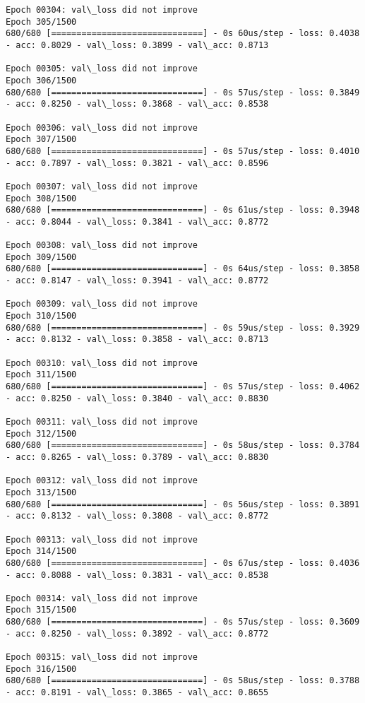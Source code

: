 \documentclass[11pt]{article}
\begin{document}
\begin{Verbatim}[commandchars=\\\{\}]
Epoch 00304: val\_loss did not improve
Epoch 305/1500
680/680 [==============================] - 0s 60us/step - loss: 0.4038 - acc: 0.8029 - val\_loss: 0.3899 - val\_acc: 0.8713

Epoch 00305: val\_loss did not improve
Epoch 306/1500
680/680 [==============================] - 0s 57us/step - loss: 0.3849 - acc: 0.8250 - val\_loss: 0.3868 - val\_acc: 0.8538

Epoch 00306: val\_loss did not improve
Epoch 307/1500
680/680 [==============================] - 0s 57us/step - loss: 0.4010 - acc: 0.7897 - val\_loss: 0.3821 - val\_acc: 0.8596

Epoch 00307: val\_loss did not improve
Epoch 308/1500
680/680 [==============================] - 0s 61us/step - loss: 0.3948 - acc: 0.8044 - val\_loss: 0.3841 - val\_acc: 0.8772

Epoch 00308: val\_loss did not improve
Epoch 309/1500
680/680 [==============================] - 0s 64us/step - loss: 0.3858 - acc: 0.8147 - val\_loss: 0.3941 - val\_acc: 0.8772

Epoch 00309: val\_loss did not improve
Epoch 310/1500
680/680 [==============================] - 0s 59us/step - loss: 0.3929 - acc: 0.8132 - val\_loss: 0.3858 - val\_acc: 0.8713

Epoch 00310: val\_loss did not improve
Epoch 311/1500
680/680 [==============================] - 0s 57us/step - loss: 0.4062 - acc: 0.8250 - val\_loss: 0.3840 - val\_acc: 0.8830

Epoch 00311: val\_loss did not improve
Epoch 312/1500
680/680 [==============================] - 0s 58us/step - loss: 0.3784 - acc: 0.8265 - val\_loss: 0.3789 - val\_acc: 0.8830

Epoch 00312: val\_loss did not improve
Epoch 313/1500
680/680 [==============================] - 0s 56us/step - loss: 0.3891 - acc: 0.8132 - val\_loss: 0.3808 - val\_acc: 0.8772

Epoch 00313: val\_loss did not improve
Epoch 314/1500
680/680 [==============================] - 0s 67us/step - loss: 0.4036 - acc: 0.8088 - val\_loss: 0.3831 - val\_acc: 0.8538

Epoch 00314: val\_loss did not improve
Epoch 315/1500
680/680 [==============================] - 0s 57us/step - loss: 0.3609 - acc: 0.8250 - val\_loss: 0.3892 - val\_acc: 0.8772

Epoch 00315: val\_loss did not improve
Epoch 316/1500
680/680 [==============================] - 0s 58us/step - loss: 0.3788 - acc: 0.8191 - val\_loss: 0.3865 - val\_acc: 0.8655


\end{Verbatim}
\end{document}
